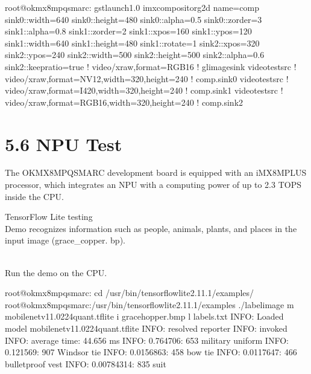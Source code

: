 \documentclass[letterpaper,10pt,openany,english]{sphinxmanual}
\begin{document}
\begin{sphinxVerbatim}[commandchars=\\\{\}]
root@ok\PYGZhy{}mx8mpq\PYGZhy{}smarc:\PYGZti{}\PYGZsh{} gst\PYGZhy{}launch\PYGZhy{}1.0 imxcompositor\PYGZus{}g2d name=comp sink\PYGZus{}0::width=640 sink\PYGZus{}0::height=480 sink\PYGZus{}0::alpha=0.5 sink\PYGZus{}0::z\PYGZhy{}order=3 sink\PYGZus{}1::alpha=0.8 sink\PYGZus{}1::z\PYGZhy{}order=2 sink\PYGZus{}1::xpos=160 sink\PYGZus{}1::ypos=120 sink\PYGZus{}1::width=640 sink\PYGZus{}1::height=480 sink\PYGZus{}1::rotate=1 sink\PYGZus{}2::xpos=320 sink\PYGZus{}2::ypos=240 sink\PYGZus{}2::width=500 sink\PYGZus{}2::height=500 sink\PYGZus{}2::alpha=0.6 sink\PYGZus{}2::keep\PYGZhy{}ratio=true ! video/x\PYGZhy{}raw,format=RGB16 ! glimagesink videotestsrc ! video/x\PYGZhy{}raw,format=NV12,width=320,height=240 ! comp.sink\PYGZus{}0 videotestsrc ! video/x\PYGZhy{}raw,format=I420,width=320,height=240 ! comp.sink\PYGZus{}1 videotestsrc ! video/x\PYGZhy{}raw,format=RGB16,width=320,height=240 ! comp.sink\PYGZus{}2
\end{sphinxVerbatim}


\section{5.6 NPU Test}
\label{\detokenize{linux-manual:npu-test}}
\sphinxAtStartPar
The OK\sphinxhyphen{}MX8MPQ\sphinxhyphen{}SMARC development board is equipped with an iMX8MPLUS processor, which integrates an NPU with a computing power of up to 2.3 TOPS inside the CPU.

\sphinxAtStartPar
TensorFlow Lite testing\\
Demo recognizes information such as people, animals, plants, and places in the input image (grace\_copper. bp).

\sphinxAtStartPar
{}\\
Run the demo on the CPU.

\begin{sphinxVerbatim}[commandchars=\\\{\}]
root@ok\PYGZhy{}mx8mpq\PYGZhy{}smarc:\PYGZti{}\PYGZsh{} cd /usr/bin/tensorflow\PYGZhy{}lite\PYGZhy{}2.11.1/examples/
root@ok\PYGZhy{}mx8mpq\PYGZhy{}smarc:/usr/bin/tensorflow\PYGZhy{}lite\PYGZhy{}2.11.1/examples\PYGZsh{} ./label\PYGZus{}image \PYGZhy{}m mobilenet\PYGZus{}v1\PYGZus{}1.0\PYGZus{}224\PYGZus{}quant.tflite \PYGZhy{}i grace\PYGZus{}hopper.bmp \PYGZhy{}l labels.txt
INFO: Loaded model mobilenet\PYGZus{}v1\PYGZus{}1.0\PYGZus{}224\PYGZus{}quant.tflite
INFO: resolved reporter
INFO: invoked
INFO: average time: 44.656 ms
INFO: 0.764706: 653 military uniform
INFO: 0.121569: 907 Windsor tie
INFO: 0.0156863: 458 bow tie
INFO: 0.0117647: 466 bulletproof vest
INFO: 0.00784314: 835 suit
\end{sphinxVerbatim}
\end{document}
